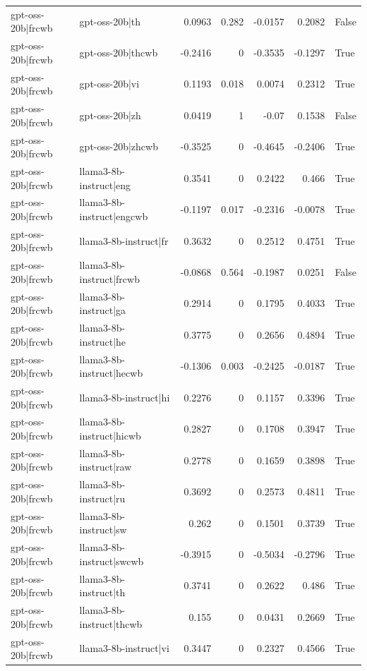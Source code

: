 \begin{table}
\begin{tabular}{l l r r r r l}
gpt-oss-20b|frcwb & gpt-oss-20b|th & 0.0963 & 0.282 & -0.0157 & 0.2082 & False \\
gpt-oss-20b|frcwb & gpt-oss-20b|thcwb & -0.2416 & 0 & -0.3535 & -0.1297 & True \\
gpt-oss-20b|frcwb & gpt-oss-20b|vi & 0.1193 & 0.018 & 0.0074 & 0.2312 & True \\
gpt-oss-20b|frcwb & gpt-oss-20b|zh & 0.0419 & 1 & -0.07 & 0.1538 & False \\
gpt-oss-20b|frcwb & gpt-oss-20b|zhcwb & -0.3525 & 0 & -0.4645 & -0.2406 & True \\
gpt-oss-20b|frcwb & llama3-8b-instruct|eng & 0.3541 & 0 & 0.2422 & 0.466 & True \\
gpt-oss-20b|frcwb & llama3-8b-instruct|engcwb & -0.1197 & 0.017 & -0.2316 & -0.0078 & True \\
gpt-oss-20b|frcwb & llama3-8b-instruct|fr & 0.3632 & 0 & 0.2512 & 0.4751 & True \\
gpt-oss-20b|frcwb & llama3-8b-instruct|frcwb & -0.0868 & 0.564 & -0.1987 & 0.0251 & False \\
gpt-oss-20b|frcwb & llama3-8b-instruct|ga & 0.2914 & 0 & 0.1795 & 0.4033 & True \\
gpt-oss-20b|frcwb & llama3-8b-instruct|he & 0.3775 & 0 & 0.2656 & 0.4894 & True \\
gpt-oss-20b|frcwb & llama3-8b-instruct|hecwb & -0.1306 & 0.003 & -0.2425 & -0.0187 & True \\
gpt-oss-20b|frcwb & llama3-8b-instruct|hi & 0.2276 & 0 & 0.1157 & 0.3396 & True \\
gpt-oss-20b|frcwb & llama3-8b-instruct|hicwb & 0.2827 & 0 & 0.1708 & 0.3947 & True \\
gpt-oss-20b|frcwb & llama3-8b-instruct|raw & 0.2778 & 0 & 0.1659 & 0.3898 & True \\
gpt-oss-20b|frcwb & llama3-8b-instruct|ru & 0.3692 & 0 & 0.2573 & 0.4811 & True \\
gpt-oss-20b|frcwb & llama3-8b-instruct|sw & 0.262 & 0 & 0.1501 & 0.3739 & True \\
gpt-oss-20b|frcwb & llama3-8b-instruct|swcwb & -0.3915 & 0 & -0.5034 & -0.2796 & True \\
gpt-oss-20b|frcwb & llama3-8b-instruct|th & 0.3741 & 0 & 0.2622 & 0.486 & True \\
gpt-oss-20b|frcwb & llama3-8b-instruct|thcwb & 0.155 & 0 & 0.0431 & 0.2669 & True \\
gpt-oss-20b|frcwb & llama3-8b-instruct|vi & 0.3447 & 0 & 0.2327 & 0.4566 & True \\

\end{tabular}
\end{table}
